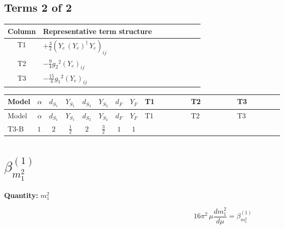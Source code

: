 \documentclass[8pt]{article}
\begin{document}
\begin{landscape}
\subsection*{Terms 2 of 2}
\begin{center}
\begin{tabular}{@{}c >{\raggedright\arraybackslash}p{0.82\linewidth}@{}}
\toprule
Column & Representative term structure \\
\midrule
T1 & \(\displaystyle +\frac{3}{2} \left({Y_e}\,\left({Y_e}\right)^{\dagger}\,{Y_e}\right)_{ij}\) \\
\midrule
T2 & \(\displaystyle -\frac{9}{4} {g_2}^2 \left({Y_e}\right)_{ij}\) \\
\midrule
T3 & \(\displaystyle -\frac{15}{4} {g_1}^2 \left({Y_e}\right)_{ij}\) \\
\midrule
\bottomrule
\end{tabular}
\end{center}
\smallskip
\tiny
\begin{longtable}{@{}llcccccc >{\raggedright\arraybackslash}p{0.21\linewidth} >{\raggedright\arraybackslash}p{0.21\linewidth} >{\raggedright\arraybackslash}p{0.21\linewidth}@{}}
\toprule
Model & $\alpha$ & $d_{S_1}$ & $Y_{S_1}$ & $d_{S_2}$ & $Y_{S_2}$ & $d_F$ & $Y_F$ & T1 & T2 & T3 \\
\midrule
\endfirsthead
\toprule
Model & $\alpha$ & $d_{S_1}$ & $Y_{S_1}$ & $d_{S_2}$ & $Y_{S_2}$ & $d_F$ & $Y_F$ & T1 & T2 & T3 \\
\midrule
\endhead
T3-B & $1$ & $2$ & $\frac{1}{2}$ & $2$ & $\frac{3}{2}$ & $1$ & $1$ & \scriptsize\adjustbox{max width=\linewidth}{$\begin{gathered} +\frac{3}{2} \left({Y_e}\,\left({Y_e}\right)^{\dagger}\,{Y_e}\right)_{ij}\end{gathered}$} & \scriptsize\adjustbox{max width=\linewidth}{$\begin{gathered} -\frac{9}{4} {g_2}^2 \left({Y_e}\right)_{ij}\end{gathered}$} & \scriptsize\adjustbox{max width=\linewidth}{$\begin{gathered} -\frac{15}{4} {g_1}^2 \left({Y_e}\right)_{ij}\end{gathered}$} \\
\midrule
\bottomrule
\end{longtable}
\clearpage
\section*{$\beta_{m_1^2}^{(1)}$}
\noindent\textbf{Quantity: }$m_1^2$\par\smallskip
\[16\pi^2\,\mu\frac{d m_1^2}{d\mu}=\beta_{m_1^2}^{(1)}\]

\end{landscape}
\end{document}
